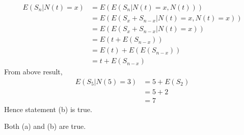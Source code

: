 \documentclass[journal,12pt,twocolumn]{IEEEtran}
\theoremstyle{remark}
\begin{document}
\begin{enumerate}[label=(\alph*)]
\begin{align}
E(S_n | N(t) = x) &= E(E(S_n | N(t) = x, N(t))) \\
&= E(E(S_x + S_{n-x} | N(t) = x, N(t) = x))\\
&= E(E(S_x + S_{n-x} | N(t) = x))\\
&=E(t + E(S_{n-x})) \\
&=E(t) + E(E(S_{n-x}))\\
 &= t + E(S_{n-x})
 \end{align}
 From above result,
 \begin{align}
 E(S_5|N(5)=3)&=5+E(S_2)\\
 &=5+2\\
 &=7
 \end{align}
 Hence statement (b) is true.
\end{enumerate}
Both (a) and (b) are true.
\end{document}
